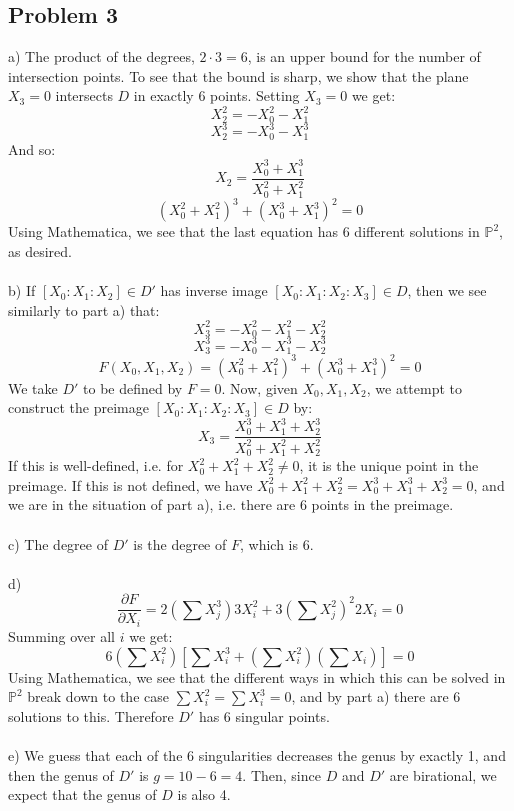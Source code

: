 \documentclass[12 pt]{article}
\newcommand{\Proj}{\mathbb{P}}
\newcommand{\p}{\partial}
\begin{document}
\subsection*{Problem 3}
a) The product of the degrees, $2\cdot 3 = 6$, is an upper bound for the number of intersection points. To see that the bound is sharp, we show that the plane $X_3 = 0$ intersects $D$ in exactly 6 points. Setting $X_3 = 0$ we get:
\[         X_2^2 = - X_0^2 - X_1^2      \]
\[          X_2^3 = - X_0^3 - X_1^3    \]
And so:
\[       X_2 = \frac{X_0^3 + X_1^3}{X_0^2 + X_1^2}      \]
\[        ( X_0^2 + X_1^2)^3 + (X_0^3 + X_1^3)^2 = 0            \]
Using Mathematica, we see that the last equation has 6 different solutions in $\Proj^2$, as desired.
\\
\\
b) If $[X_0 : X_1 : X_2] \in D'$ has inverse image $[X_0 : X_1 : X_2 : X_3] \in D$, then we see similarly to part a) that:
\[         X_3^2 = - X_0^2 - X_1^2 - X_2^2     \]
\[          X_3^3 = - X_0^3 - X_1^3 - X_2^3   \]
\[         F(X_0, X_1, X_2) =    ( X_0^2 + X_1^2)^3 + (X_0^3 + X_1^3)^2 = 0        \]
We take $D'$ to be defined by $F = 0$. Now, given $X_0, X_1, X_2$, we attempt to construct the preimage $[X_0 : X_1 : X_2 : X_3] \in D$ by:
\[       X_3 = \frac{X_0^3 + X_1^3 + X_2^3}{X_0^2 + X_1^2 + X_2^2}         \]
If this is well-defined, i.e. for $X_0^2 + X_1^2 + X_2^2 \neq 0$, it is the unique point in the preimage. If this is not defined, we have $X_0^2 + X_1^2 + X_2^2 = X_0^3 + X_1^3 + X_2^3 = 0$, and we are in the situation of part a), i.e. there are 6 points in the preimage.
\\
\\
c) The degree of $D'$ is the degree of $F$, which is 6.
\\
\\
d) \[       \frac{\p F}{\p X_i} = 2 (\sum X_j^3) 3 X_i^2 + 3 \left(\sum X_j^2\right)^2 2X_i = 0     \]
Summing over all $i$ we get:
\[         6 \left(\sum X_i^2\right) \left[ \sum X_i^3 + \left( \sum X_i^2\right) \left( \sum X_i \right) \right]  = 0    \]
Using Mathematica, we see that the different ways in which this can be solved in $\Proj^2$ break down to the case $\sum X_i^2 = \sum X_i^3 = 0$, and by part a) there are 6 solutions to this. Therefore $D'$ has 6 singular points.
\\
\\
e) We guess that each of the 6 singularities decreases the genus by exactly 1, and then the genus of $D'$ is $g = 10 - 6 = 4$. Then, since $D$ and $D'$ are birational, we expect that the genus of $D$ is also 4.
\end{document}
